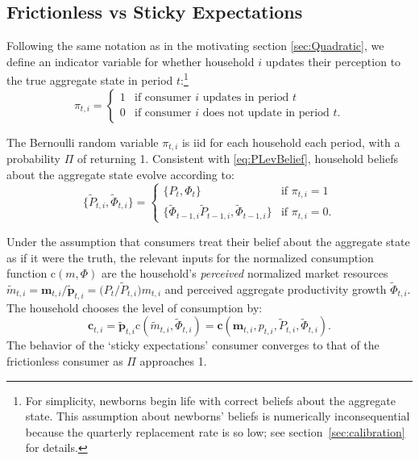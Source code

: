 \documentclass[titlepage]{article}
\begin{document}
\subsection{Frictionless vs Sticky Expectations}\label{sec:StickySOE}

Following the same notation as in the motivating section \ref{sec:Quadratic}, we define an indicator variable for whether household $i$ updates their perception to the true aggregate state in period $t$:\footnote{For simplicity, newborns begin life with correct beliefs about the aggregate state.  This assumption about newborns' beliefs is numerically inconsequential because the quarterly replacement rate is so low; see section~\ref{sec:calibration} for details.}
\begin{equation*}
\pi_{t,i} =
\begin{cases}
   1 & \text{if consumer $i$ updates in period $t$}
\\ 0 & \text{if consumer $i$ does not update in period $t$}.
\end{cases}
\end{equation*}

The Bernoulli random variable $\pi_{t,i}$ is iid for each household each period, with a probability $\Pi$ of returning 1.  Consistent with \eqref{eq:PLevBelief}, household beliefs about the aggregate state evolve according to:
\begin{equation}\label{eq:PLevBeliefSOE}
\{\widetilde{P}_{t,i},\widetilde{\Phi}_{t,i}\} = \begin{cases}
\{P_t, \Phi_t\} & \text{if } \pi_{t,i} = 1 \\
\{\widetilde{\Phi}_{t-1,i} \widetilde{P}_{t-1,i} , \widetilde{\Phi}_{t-1,i} \} & \text{if } \pi_{t,i} = 0.
\end{cases}
\end{equation}

Under the assumption that consumers treat their belief about the aggregate state as if it were the truth, the relevant inputs for the normalized consumption function $\mathrm{c}(m,\Phi)$ are the household's \textit{perceived} normalized market resources $\widetilde{m}_{t,i} = \mathbf{m}_{t,i}\big/\widetilde{\pmb{p}}_{t,i} = \big(P_t\big/\widetilde{P}_{t,i}\big)m_{t,i}$ and perceived aggregate productivity growth $\widetilde{\Phi}_{t,i}$.  The household chooses the level of consumption by:
\begin{equation*}
   \mathbf{c}_{t,i} = \widetilde{\pmb{p}}_{t,i} \mathrm{c}(\widetilde{m}_{t,i},\widetilde{\Phi}_{t,i}) = \textbf{c}(\mathbf{m}_{t,i}, p_{t,i}, \widetilde{P}_{t,i}, \widetilde{\Phi}_{t,i}). \label{eq:cPerc}
\end{equation*}
 The behavior of the `sticky expectations' consumer converges to that of the frictionless consumer as $\Pi$ approaches 1.
\end{document}
